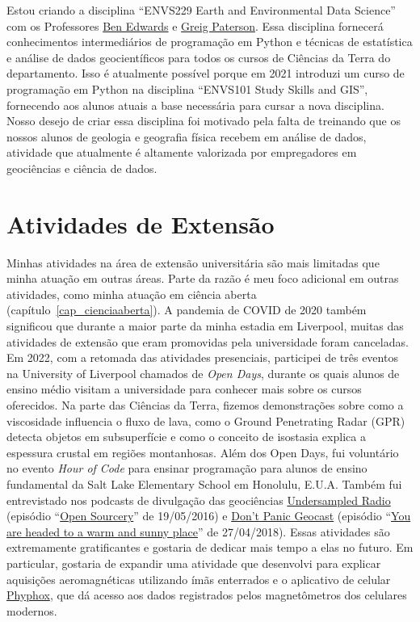 \documentclass[10pt,a4paper,oneside]{book}
\begin{document}
Estou criando a disciplina ``ENVS229 Earth and Environmental Data Science'' com
os Professores \href{https://www.liverpool.ac.uk/environmental-sciences/staff/ben-edwards/}{Ben Edwards}
e \href{https://www.liverpool.ac.uk/environmental-sciences/staff/greig-paterson/}{Greig Paterson}.
Essa disciplina fornecerá conhecimentos intermediários de programação em Python
e técnicas de estatística e análise de dados geocientíficos para todos os
cursos de Ciências da Terra do departamento.
Isso é atualmente possível porque em 2021 introduzi um curso de programação em
Python na disciplina ``ENVS101 Study Skills and GIS'', fornecendo aos alunos
atuais a base necessária para cursar a nova disciplina.
Nosso desejo de criar essa disciplina foi motivado pela falta de treinando que
os nossos alunos de geologia e geografia física recebem em análise de dados,
atividade que atualmente é altamente valorizada por empregadores em geociências
e ciência de dados.

\section{Atividades de Extensão}

Minhas atividades na área de extensão universitária são mais limitadas que
minha atuação em outras áreas.
Parte da razão é meu foco adicional em outras atividades, como minha atuação
em ciência aberta (capítulo~\ref{cap_cienciaaberta}).
A pandemia de COVID de 2020 também significou que durante a maior parte da
minha estadia em Liverpool, muitas das atividades de extensão que eram
promovidas pela universidade foram canceladas.
Em 2022, com a retomada das atividades presenciais, participei de três eventos
na University of Liverpool chamados de \textit{Open Days}, durante os quais
alunos de ensino médio visitam a universidade para conhecer mais sobre os
cursos oferecidos.
Na parte das Ciências da Terra, fizemos demonstrações sobre como a viscosidade
influencia o fluxo de lava, como o Ground Penetrating Radar (GPR) detecta
objetos em subsuperfície e como o conceito de isostasia explica a espessura
crustal em regiões montanhosas.
Além dos Open Days, fui voluntário no evento \textit{Hour of Code} para ensinar
programação para alunos de ensino fundamental da Salt Lake Elementary School em
Honolulu, E.U.A.
Também fui entrevistado nos podcasts de divulgação das geociências
\href{https://undersampledrad.io}{Undersampled Radio}
(episódio ``\href{https://undersampledrad.io/home/2016/7/open-sourcery}{Open
Sourcery}'' de 19/05/2016)
e \href{https://www.dontpanicgeocast.com/166}{Don't Panic Geocast}
(episódio ``\href{https://www.dontpanicgeocast.com/166}{You are headed to a warm and sunny place}''
de 27/04/2018).
Essas atividades são extremamente gratificantes e gostaria de dedicar mais
tempo a elas no futuro.
Em particular, gostaria de expandir uma atividade que desenvolvi para explicar
aquisições aeromagnéticas utilizando ímãs enterrados e o aplicativo de celular
\href{https://phyphox.org/}{Phyphox}, que dá acesso aos dados registrados pelos
magnetômetros dos celulares modernos.
\end{document}
